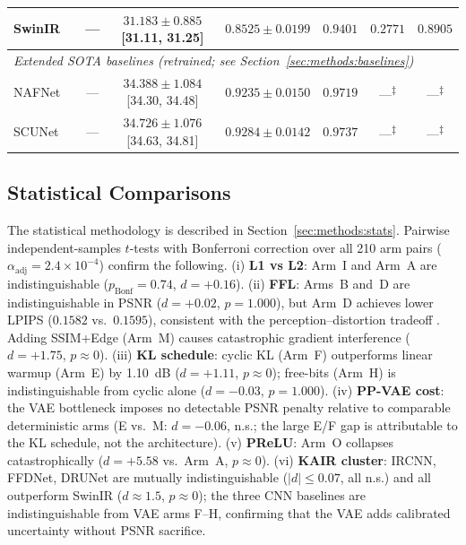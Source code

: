 \documentclass[12pt, a4paper, twoside, openright]{book}
\begin{document}
\begin{landscape}
\begin{longtable}{llcccccc}
SwinIR & \cite{liang_swinir_2021}  & --- & $31.183 \pm 0.885$ {[31.11, 31.25]} & $0.8525 \pm 0.0199$ & $0.9401$ & $0.2771$ & $0.8905$ \\
\midrule
\multicolumn{8}{l}{\textit{Extended SOTA baselines (retrained; see Section~\ref{sec:methods:baselines})}} \\
NAFNet & \cite{chen_nafnet_2022}   & --- & $34.388 \pm 1.084$ {[34.30, 34.48]} & $0.9235 \pm 0.0150$ & $0.9719$ & ---\textsuperscript{$\ddagger$} & ---\textsuperscript{$\ddagger$} \\
SCUNet & \cite{zhang_scunet_2023}  & --- & $\mathbf{34.726 \pm 1.076}$ {[34.63, 34.81]} & $\mathbf{0.9284 \pm 0.0142}$ & $\mathbf{0.9737}$ & ---\textsuperscript{$\ddagger$} & ---\textsuperscript{$\ddagger$} \\
%
\end{longtable}
\end{landscape}

\subsection{Statistical Comparisons}
\label{sec:results:recon:stats}

The statistical methodology is described in Section~\ref{sec:methods:stats}. Pairwise independent-samples $t$-tests with Bonferroni correction over all 210 arm pairs ($\alpha_{\mathrm{adj}}=2.4\times10^{-4}$) confirm the following. (i) \textbf{L1 vs L2}: Arm~I and Arm~A are indistinguishable ($p_{\mathrm{Bonf}}=0.74$, $d=+0.16$). (ii) \textbf{FFL}: Arms~B and~D are indistinguishable in PSNR ($d=+0.02$, $p=1.000$), but Arm~D achieves lower LPIPS ($0.1582$ vs.\ $0.1595$), consistent with the perception--distortion tradeoff \cite{blau_perception_2018}. Adding SSIM+Edge (Arm~M) causes catastrophic gradient interference ($d=+1.75$, $p\approx 0$). (iii) \textbf{KL schedule}: cyclic KL (Arm~F) outperforms linear warmup (Arm~E) by 1.10~dB ($d=+1.11$, $p\approx 0$); free-bits (Arm~H) is indistinguishable from cyclic alone ($d=-0.03$, $p=1.000$). (iv) \textbf{PP-VAE cost}: the VAE bottleneck imposes no detectable PSNR penalty relative to comparable deterministic arms (E vs.\ M: $d=-0.06$, n.s.; the large E/F gap is attributable to the KL schedule, not the architecture). (v) \textbf{PReLU}: Arm~O collapses catastrophically ($d=+5.58$ vs.\ Arm~A, $p\approx 0$). (vi) \textbf{KAIR cluster}: IRCNN, FFDNet, DRUNet are mutually indistinguishable ($|d|\leq 0.07$, all n.s.) and all outperform SwinIR ($d\approx 1.5$, $p\approx 0$); the three CNN baselines are indistinguishable from VAE arms F--H, confirming that the VAE adds calibrated uncertainty without PSNR sacrifice.
\end{document}
